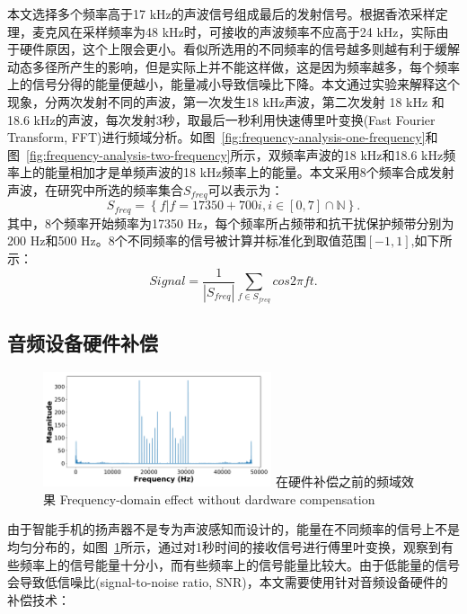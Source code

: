 本文选择多个频率高于17 kHz的声波信号组成最后的发射信号。根据香浓采样定理，麦克风在采样频率为48 kHz时，可接收的声波频率不应高于24 kHz，实际由于硬件原因，这个上限会更小。看似所选用的不同频率的信号越多则越有利于缓解动态多径所产生的影响，但是实际上并不能这样做，这是因为频率越多，每个频率上的信号分得的能量便越小，能量减小导致信噪比下降。本文通过实验来解释这个现象，分两次发射不同的声波，第一次发生18 kHz声波，第二次发射 18 kHz 和 18.6 kHz的声波，每次发射3秒，取最后一秒利用快速傅里叶变换(Fast Fourier Transform, FFT)进行频域分析。如图~\ref{fig:frequency-analysis-one-frequency}和图~\ref{fig:frequency-analysis-two-frequency}所示，双频率声波的18 kHz和18.6 kHz频率上的能量相加才是单频声波的18 kHz频率上的能量。本文采用8个频率合成发射声波，在研究中所选的频率集合$S_{freq}$可以表示为：
\begin{equation}
  S_{freq}=  \left\lbrace f | f=17350+700i, i \in \left[ 0,7 \right] \cap \mathbb{N} \right\rbrace.
\end{equation}
其中，8个频率开始频率为17350 Hz，每个频率所占频带和抗干扰保护频带分别为200 Hz和500 Hz。8个不同频率的信号被计算并标准化到取值范围$[-1,1]$,如下所示：
\begin{equation}
  Signal=\frac{1}{|S_{freq}|}\sum_{f \in S_{freq}}cos 2\pi ft.
\end{equation}

\subsection{音频设备硬件补偿}

\begin{figure}[!htp]
  \centering
  \includegraphics[width=0.6\textwidth]{figure/nocompensation.pdf}
  \bicaption
    {在硬件补偿之前的频域效果}
    {Frequency-domain effect without dardware compensation}
  \label{fig:nocompensation}
\end{figure}

由于智能手机的扬声器不是专为声波感知而设计的，能量在不同频率的信号上不是均匀分布的，如图~\ref{fig:nocompensation}所示，通过对1秒时间的接收信号进行傅里叶变换，观察到有些频率上的信号能量十分小，而有些频率上的信号能量比较大。由于低能量的信号会导致低信噪比(signal-to-noise ratio, SNR)，本文需要使用针对音频设备硬件的补偿技术：

